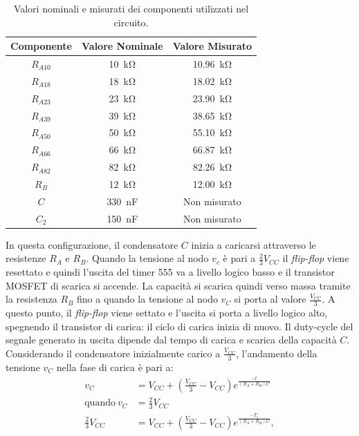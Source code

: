 \def\arraystretch{1.3}
\begin{table}[h!]
	\centering
	\begin{tabular}{|c|c|c|}
		\hline
		Componente	& Valore Nominale & Valore Misurato \\ \hline
		$R_{A10}$ &\SI{10}{\kilo\ohm} & \SI{10.96}{\kilo\ohm} \\ \hline
		$R_{A18}$ &\SI{18}{\kilo\ohm} & \SI{18.02}{\kilo\ohm} \\ \hline
		$R_{A23}$ &\SI{23}{\kilo\ohm} & \SI{23.90}{\kilo\ohm} \\ \hline
		$R_{A39}$ &\SI{39}{\kilo\ohm} & \SI{38.65}{\kilo\ohm} \\ \hline
		$R_{A50}$ &\SI{50}{\kilo\ohm} & \SI{55.10}{\kilo\ohm} \\ \hline
		$R_{A66}$ &\SI{66}{\kilo\ohm} & \SI{66.87}{\kilo\ohm} \\ \hline
		$R_{A82}$ &\SI{82}{\kilo\ohm} & \SI{82.26}{\kilo\ohm} \\ \hline
		$R_B$ &\SI{12}{\kilo\ohm} & \SI{12.00}{\kilo\ohm} \\ \hline
		$C$ & \SI{330}{\nano\farad} & Non misurato \\ \hline
		$C_2$ & \SI{150}{\nano\farad} & Non misurato \\ \hline
	\end{tabular}
	\caption{Valori nominali e misurati dei componenti utilizzati nel circuito.}
	\label{tab:valori_componenti_2}
\end{table}
In questa configurazione, il condensatore $C$ inizia a caricarsi attraverso le resistenze $R_A$ e $R_B$. Quando la tensione al nodo $v_c$ è pari a $\frac{2}{3}V_{CC}$ il \textit{flip-flop} viene resettato e quindi l'uscita del timer 555 va a livello logico basso e il transistor MOSFET di scarica si accende. La capacità si scarica quindi verso massa tramite la resistenza $R_B$ fino a quando la tensione al nodo $v_C$ si porta al valore $\frac{V_{CC}}{3}$. A questo punto, il \textit{flip-flop} viene settato e l'uscita si porta a livello logico alto, spegnendo il transistor di carica: il ciclo di carica inizia di nuovo. Il duty-cycle del segnale generato in uscita dipende dal tempo di carica e scarica della capacità $C$. Considerando il condensatore inizialmente carico a $\frac{V_{CC}}{3}$, l'andamento della tensione $v_C$ nella fase di carica è pari a:
\begin{equation}
	\begin{split}
		v_C&=V_{CC}+(\frac{V_{CC}}{3}-V_{CC})e^{\frac{-t}{(R_A+R_B)C}} \\
		\text{quando}\  v_C&=\frac{2}{3}V_{CC} \\
		\frac{2}{3}V_{CC}&=V_{CC}+(\frac{V_{CC}}{3}-V_{CC})e^{\frac{-T_1}{(R_A+R_B)C}}, \\
	\end{split}
\end{equation}
